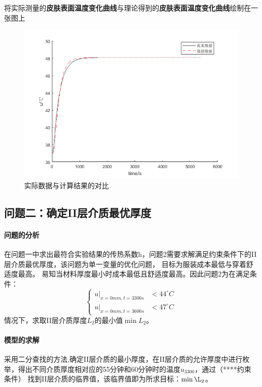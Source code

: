 \documentclass{cumcmthesis}
\begin{document}
            将实际测量的\textbf{皮肤表面温度变化曲线}与理论得到的\textbf{皮肤表面温度变化曲线}绘制在一张图上
            \begin{figure}[ht] 
                \centering 
                \includegraphics[scale=0.9]{../figure/ques1result.png} 
                \caption{实际数据与计算结果的对比}\label{cou}    
            \end{figure}


    \subsection{问题二：确定II层介质最优厚度} 
        \paragraph{问题的分析} 
        
            在问题一中求出最符合实验结果的传热系数h，问题2需要求解满足约束条件下的II层介质最优厚度，该问题为单一变量的优化问题，
            目标为服装成本最低与穿着舒适度最高。
            易知当材料厚度最小时成本最低且舒适度最高。因此问题2为在满足条件：
                \[
                    \left\{
                        \begin{aligned}
                            u|_{x=0mm,t=3300s}&<44^{\circ}C\\
                            u|_{x=0mm,t=3600s}&<47^{\circ}C
                        \end{aligned}
                    \right.     
                \]
            情况下，求取II层介质厚度\(L_2\)的最小值\(\min{L_2}\)。
        \paragraph{模型的求解}
            采用二分查找的方法,确定II层介质的最小厚度，在II层介质的允许厚度中进行枚举，得出不同介质厚度相对应的55分钟和60分钟时的温度\(u_{3300}\)，通过（****约束条件）
            找到II层介质的临界值，该临界值即为所求目标：\(\min{\L_2}\)。
\end{document}
